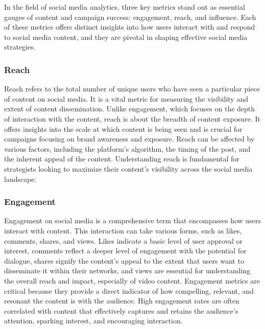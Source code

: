 \documentclass[
]{book}
\begin{document}
In the field of social media analytics, three key metrics stand out as essential gauges of content and campaign success: engagement, reach, and influence. Each of these metrics offers distinct insights into how users interact with and respond to social media content, and they are pivotal in shaping effective social media strategies.

\hypertarget{reach}{%
\subsubsection*{Reach}\label{reach}}

Reach refers to the total number of unique users who have seen a particular piece of content on social media. It is a vital metric for measuring the visibility and extent of content dissemination. Unlike engagement, which focuses on the depth of interaction with the content, reach is about the breadth of content exposure. It offers insights into the scale at which content is being seen and is crucial for campaigns focusing on brand awareness and exposure. Reach can be affected by various factors, including the platform's algorithm, the timing of the post, and the inherent appeal of the content. Understanding reach is fundamental for strategists looking to maximize their content's visibility across the social media landscape.

\hypertarget{engagement}{%
\subsubsection*{Engagement}\label{engagement}}

Engagement on social media is a comprehensive term that encompasses how users interact with content. This interaction can take various forms, such as likes, comments, shares, and views. Likes indicate a basic level of user approval or interest, comments reflect a deeper level of engagement with the potential for dialogue, shares signify the content's appeal to the extent that users want to disseminate it within their networks, and views are essential for understanding the overall reach and impact, especially of video content. Engagement metrics are critical because they provide a direct indicator of how compelling, relevant, and resonant the content is with the audience. High engagement rates are often correlated with content that effectively captures and retains the audience's attention, sparking interest, and encouraging interaction.
\end{document}

